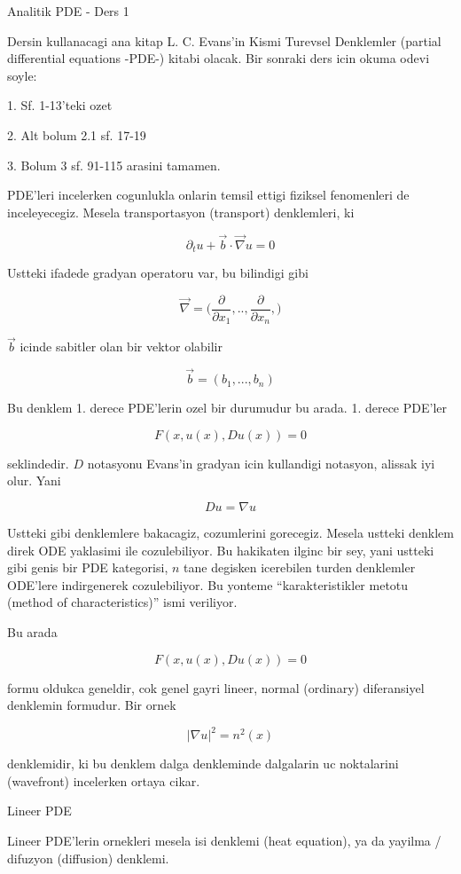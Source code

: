 \documentclass[12pt,fleqn]{article}
\begin{document}
Analitik PDE - Ders 1

Dersin kullanacagi ana kitap L. C. Evans'in Kismi Turevsel Denklemler
(partial differential equations -PDE-) kitabi olacak. Bir sonraki ders icin
okuma odevi soyle:

1. Sf. 1-13'teki ozet

2. Alt bolum 2.1 sf. 17-19

3. Bolum 3 sf. 91-115 arasini tamamen. 

PDE'leri incelerken cogunlukla onlarin temsil ettigi fiziksel fenomenleri
de inceleyecegiz. Mesela transportasyon (transport) denklemleri, ki

\[ \partial_t u + \vec{b} \cdot \vec{\nabla} u = 0 \]

Ustteki ifadede gradyan operatoru var, bu bilindigi gibi

\[ \vec{\nabla} = \bigg( 
\frac{\partial }{\partial x_1},.., 
\frac{\partial }{\partial x_n},
\bigg)
\]

$\vec{b}$ icinde sabitler olan bir vektor olabilir

\[ \vec{b} = (b_1,...,b_n)
 \]

Bu denklem 1. derece PDE'lerin ozel bir durumudur bu arada. 1. derece
PDE'ler 

\[ F(x, u(x), Du(x)) = 0 \]

seklindedir. $D$ notasyonu Evans'in gradyan icin kullandigi notasyon,
alissak iyi olur. Yani

\[ Du = \nabla u \]

Ustteki gibi denklemlere bakacagiz, cozumlerini gorecegiz. Mesela ustteki
denklem direk ODE yaklasimi ile cozulebiliyor. Bu hakikaten ilginc bir sey,
yani ustteki gibi genis bir PDE kategorisi, $n$ tane degisken icerebilen
turden denklemler ODE'lere indirgenerek cozulebiliyor. Bu yonteme
``karakteristikler metotu (method of characteristics)'' ismi veriliyor.

Bu arada

\[ F(x, u(x), Du(x)) = 0 \]

formu oldukca geneldir, cok genel gayri lineer, normal (ordinary)
diferansiyel denklemin formudur. Bir ornek

\[ |\nabla u|^2 = n^2(x) \]

denklemidir, ki bu denklem dalga denkleminde dalgalarin uc noktalarini
(wavefront) incelerken ortaya cikar. 

Lineer PDE

Lineer PDE'lerin ornekleri mesela isi denklemi (heat equation), ya da
yayilma / difuzyon (diffusion) denklemi.
\end{document}
